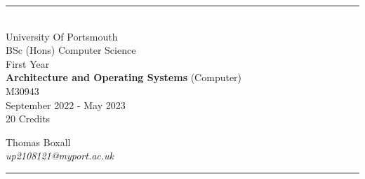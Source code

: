 \documentclass[a4paper, 11pt]{report}
\begin{document}
\begin{titlepage}
    \rule{\textwidth}{1px}
    \vspace{0.025\textheight}\\
    \huge{University Of Portsmouth}\\
    \huge{BSc (Hons) Computer Science}\\
    \huge{First Year}\\
    \vfill
    \LARGE{\textbf{Architecture and Operating Systems} (Computer)}\\
    \Large{M30943}\\
    \large{September 2022 - May 2023}\\
    \large{20 Credits}
    \vfill

    
    \begin{FlushRight}
        \large{Thomas Boxall}\\
        \textit{up2108121@myport.ac.uk}\\
        
    \end{FlushRight}
    \vspace{0.2\textheight}
    \rule{\textwidth}{1px}
    
\end{titlepage}

\tableofcontents



\end{document}
